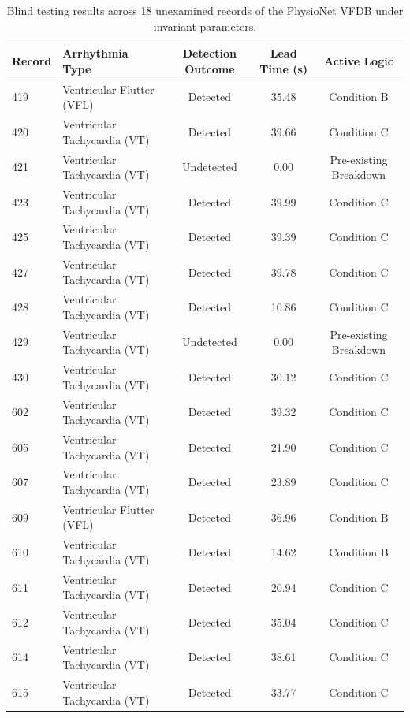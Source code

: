 \documentclass[11pt,a4paper]{article}
\begin{document}
\begin{table}[htbp]
\centering
\small
\caption{Blind testing results across 18 unexamined records of the PhysioNet VFDB under invariant parameters.}
\label{tab:blind_results}
\begin{tabular}{llccc}
\toprule
\textbf{Record} & \textbf{Arrhythmia Type} & \textbf{Detection Outcome} & \textbf{Lead Time (s)} & \textbf{Active Logic} \\
\midrule
419 & Ventricular Flutter (VFL) & Detected & 35.48 & Condition B \\
420 & Ventricular Tachycardia (VT) & Detected & 39.66 & Condition C \\
421 & Ventricular Tachycardia (VT) & Undetected & 0.00 & Pre-existing Breakdown \\
423 & Ventricular Tachycardia (VT) & Detected & 39.99 & Condition C \\
425 & Ventricular Tachycardia (VT) & Detected & 39.39 & Condition C \\
427 & Ventricular Tachycardia (VT) & Detected & 39.78 & Condition C \\
428 & Ventricular Tachycardia (VT) & Detected & 10.86 & Condition C \\
429 & Ventricular Tachycardia (VT) & Undetected & 0.00 & Pre-existing Breakdown \\
430 & Ventricular Tachycardia (VT) & Detected & 30.12 & Condition C \\
602 & Ventricular Tachycardia (VT) & Detected & 39.32 & Condition C \\
605 & Ventricular Tachycardia (VT) & Detected & 21.90 & Condition C \\
607 & Ventricular Tachycardia (VT) & Detected & 23.89 & Condition C \\
609 & Ventricular Flutter (VFL) & Detected & 36.96 & Condition B \\
610 & Ventricular Tachycardia (VT) & Detected & 14.62 & Condition B \\
611 & Ventricular Tachycardia (VT) & Detected & 20.94 & Condition C \\
612 & Ventricular Tachycardia (VT) & Detected & 35.04 & Condition C \\
614 & Ventricular Tachycardia (VT) & Detected & 38.61 & Condition C \\
615 & Ventricular Tachycardia (VT) & Detected & 33.77 & Condition C \\
\bottomrule
\end{tabular}
\end{table}
\end{document}
